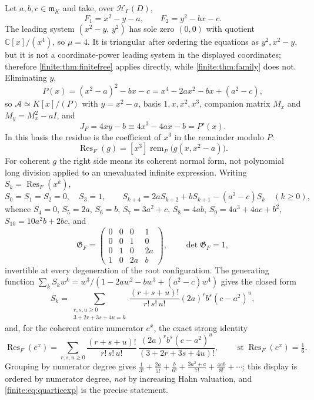 \documentclass[11pt,letterpaper]{article}
\theoremstyle{definition}
\theoremstyle{remark}
\newcommand{\C}{\mathbb C}
\newcommand{\HH}{\mathscr H}
\newcommand{\Alg}{\mathcal A}
\newcommand{\mm}{\mathfrak m}
\newcommand{\Gram}{\mathfrak G}
\DeclareMathOperator{\st}{st}
\DeclareMathOperator{\Res}{Res}
\numberwithin{equation}{section}
\begin{document}
Let $a,b,c\in\mm_K$ and take, over $\HH_\Gamma(D)$,
\begin{equation}\label{finite:eq:quarticsystem}
 F_1=x^2-y-a,\qquad F_2=y^2-bx-c .
\end{equation}
The leading system $(x^2-y,\,y^2)$ has sole zero $(0,0)$ with quotient $\C[x]/(x^4)$, so $\mu=4$. It is triangular after ordering the equations as $y^2,x^2-y$, but it is not a coordinate-power leading system in the displayed coordinates; therefore \cref{finite:thm:finitefree} applies directly, while \cref{finite:thm:family} does not. Eliminating $y$,
\begin{equation}\label{finite:eq:quartic}
 P(x)=(x^2-a)^2-bx-c=x^4-2ax^2-bx+(a^2-c),
\end{equation}
so $\Alg\simeq K[x]/(P)$ with $y=x^2-a$, basis $1,x,x^2,x^3$, companion matrix $M_x$ and $M_y=M_x^2-aI$, and
\[
 J_F=4xy-b\equiv4x^3-4ax-b=P'(x).
\]
In this basis the residue is the coefficient of $x^3$ in the remainder modulo $P$:
\[
 \Res_F(g)=[x^3]\operatorname{rem}_P\bigl(g(x,x^2-a)\bigr).
\]
For coherent $g$ the right side means its coherent normal form, not polynomial long division applied to an unevaluated infinite expression. Writing $S_k=\Res_F(x^k)$,
\begin{equation}\label{finite:eq:moments}
 S_0=S_1=S_2=0,\quad S_3=1,
 \qquad
 S_{k+4}=2aS_{k+2}+bS_{k+1}-(a^2-c)S_k\quad(k\geq0),
\end{equation}
whence $S_4=0$, $S_5=2a$, $S_6=b$, $S_7=3a^2+c$, $S_8=4ab$, $S_9=4a^3+4ac+b^2$, $S_{10}=10a^2b+2bc$, and
\begin{equation}\label{finite:eq:quarticgram}
 \Gram_F=\begin{pmatrix}0&0&0&1\\0&0&1&0\\0&1&0&2a\\1&0&2a&b\end{pmatrix},
 \qquad\det\Gram_F=1,
\end{equation}
invertible at every degeneration of the root configuration. The generating function $\sum_kS_kw^k=w^3/(1-2aw^2-bw^3+(a^2-c)w^4)$ gives the closed form
\begin{equation}\label{finite:eq:momentmultinomial}
 S_k=\sum_{\substack{r,s,u\geq0\\ 3+2r+3s+4u=k}}
 \frac{(r+s+u)!}{r!\,s!\,u!}(2a)^rb^s(c-a^2)^u,
\end{equation}
and, for the coherent entire numerator $e^x$, the exact strong identity
\begin{equation}\label{finite:eq:quarticexp}
 \Res_F(e^x)=\sum_{r,s,u\geq0}
 \frac{(r+s+u)!}{r!\,s!\,u!}\,
 \frac{(2a)^rb^s(c-a^2)^u}{(3+2r+3s+4u)!},
 \qquad \st\Res_F(e^x)=\tfrac16 .
\end{equation}
Grouping by numerator degree gives $\tfrac1{3!}+\tfrac{2a}{5!}+\tfrac b{6!}+\tfrac{3a^2+c}{7!}+\tfrac{4ab}{8!}+\cdots$; this display is ordered by numerator degree, \emph{not} by increasing Hahn valuation, and \eqref{finite:eq:quarticexp} is the precise statement.
\end{document}
